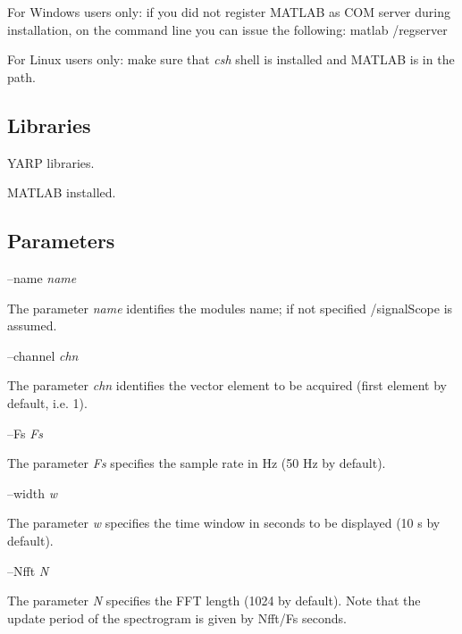 For Windows users only\+: if you did not register M\+A\+T\+L\+AB as C\+OM server during installation, on the command line you can issue the following\+: matlab /regserver

For Linux users only\+: make sure that {\itshape csh} shell is installed and M\+A\+T\+L\+AB is in the path.\hypertarget{group__icub__signalScope_lib_sec}{}\subsection{Libraries}\label{group__icub__signalScope_lib_sec}

\begin{DoxyItemize}
\item Y\+A\+RP libraries.
\item M\+A\+T\+L\+AB installed.
\end{DoxyItemize}\hypertarget{group__icub__signalScope_parameters_sec}{}\subsection{Parameters}\label{group__icub__signalScope_parameters_sec}
--name {\itshape name} 
\begin{DoxyItemize}
\item The parameter {\itshape name} identifies the module\textquotesingle{}s name; if not specified /signal\+Scope is assumed.
\end{DoxyItemize}

--channel {\itshape chn} 
\begin{DoxyItemize}
\item The parameter {\itshape chn} identifies the vector element to be acquired (first element by default, i.\+e. 1).
\end{DoxyItemize}

--Fs {\itshape Fs} 
\begin{DoxyItemize}
\item The parameter {\itshape Fs} specifies the sample rate in Hz (50 Hz by default).
\end{DoxyItemize}

--width {\itshape w} 
\begin{DoxyItemize}
\item The parameter {\itshape w} specifies the time window in seconds to be displayed (10 s by default).
\end{DoxyItemize}

--Nfft {\itshape N} 
\begin{DoxyItemize}
\item The parameter {\itshape N} specifies the F\+FT length (1024 by default). Note that the update period of the spectrogram is given by Nfft/\+Fs seconds.
\end{DoxyItemize}

